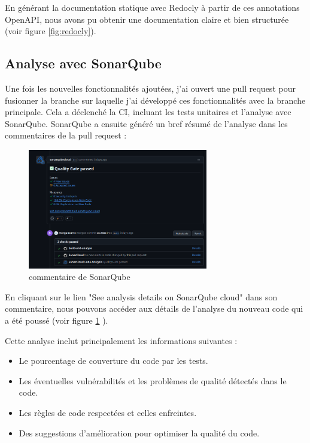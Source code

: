 \documentclass[11pt]{article}
\begin{document}
		En générant la documentation statique avec Redocly à partir de ces annotations OpenAPI, nous avons pu obtenir une documentation claire et bien structurée (voir figure \ref{fig:redocly}).
		
		\subsection*{Analyse avec SonarQube}
		\label{analyse:sonar}
		Une fois les nouvelles fonctionnalités ajoutées, j'ai ouvert une pull request pour fusionner la branche sur laquelle j'ai développé ces fonctionnalités avec la branche principale. Cela a déclenché la CI, incluant les tests unitaires et l'analyse avec SonarQube. SonarQube a ensuite généré un bref résumé de l'analyse dans les commentaires de la pull request : 
		
			\begin{figure}[H] \centering \includegraphics[width=0.7\textwidth]{asset/sonarq_com.png} \caption{commentaire de SonarQube} \label{fig:sonarq}\end{figure}
		
		En cliquant sur le lien "See analysis details on SonarQube cloud" dans son commentaire, nous pouvons accéder aux détails de l'analyse du nouveau code qui a été poussé (voir figure \ref{fig:sonarq} ). 
		
		Cette analyse inclut principalement les informations suivantes : \begin{itemize} \item Le pourcentage de couverture du code par les tests. \item Les éventuelles vulnérabilités et les problèmes de qualité détectés dans le code. \item Les règles de code respectées et celles enfreintes. \item Des suggestions d'amélioration pour optimiser la qualité du code. \end{itemize}
		
\end{document}

